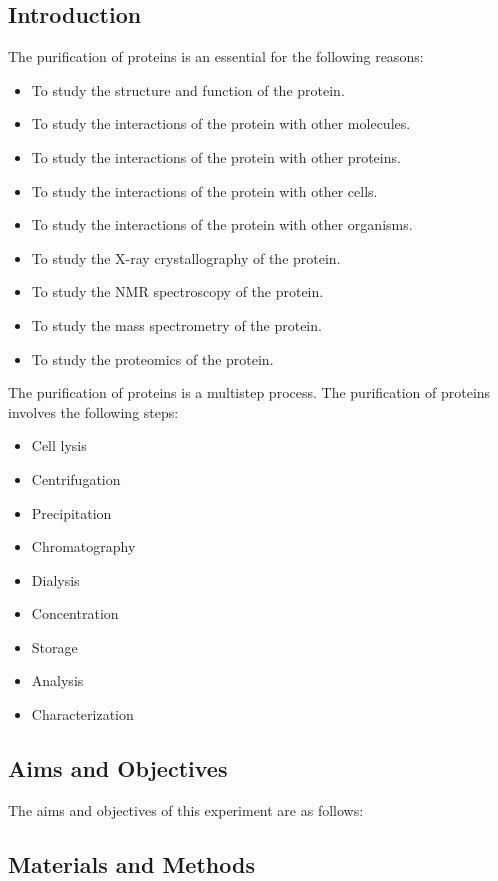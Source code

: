 \documentclass{article}
\begin{document}
\begin{multicols}{2}

\subsection*{Introduction}
The purification of proteins is an essential for the following reasons:
\begin{itemize}
    \item To study the structure and function of the protein.
    \item To study the interactions of the protein with other molecules.
    \item To study the interactions of the protein with other proteins.
    \item To study the interactions of the protein with other cells.
    \item To study the interactions of the protein with other organisms.
    \item To study the X-ray crystallography of the protein.
    \item To study the NMR spectroscopy of the protein.
    \item To study the mass spectrometry of the protein.
    \item To study the proteomics of the protein.    
\end{itemize}
The purification of proteins is a multistep process. The purification of proteins involves the following steps:
\begin{itemize}
    \item Cell lysis
    \item Centrifugation
    \item Precipitation
    \item Chromatography
    \item Dialysis
    \item Concentration
    \item Storage
    \item Analysis
    \item Characterization
\end{itemize}

\subsection*{Aims and Objectives}
The aims and objectives of this experiment are as follows:


\subsection*{Materials and Methods}

\end{multicols}
\end{document}
